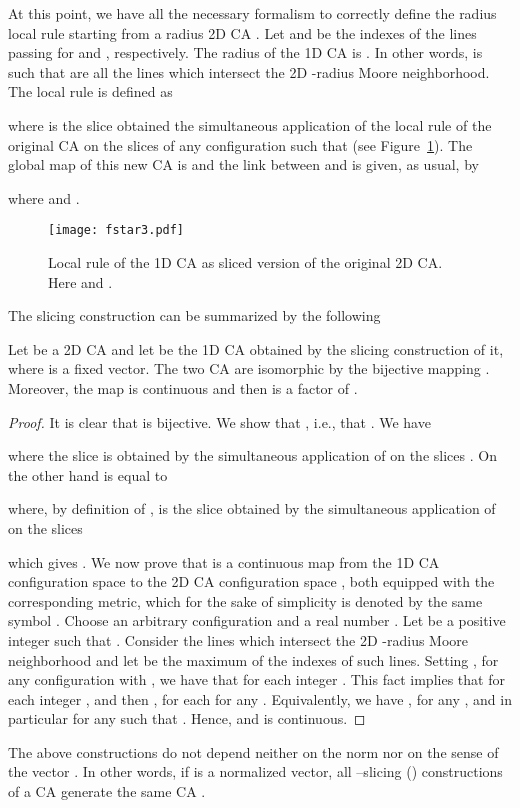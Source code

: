 \documentclass{llncs}
\begin{document}
At this point, we have all the necessary formalism to correctly
define the radius  local rule 
starting from a radius  2D CA . Let  and  be the
indexes of the lines passing for  and ,
respectively. The radius of the 1D CA is .
In other words,  is such that  are
all the lines which intersect the 2D -radius Moore
neighborhood. The local rule is defined as

where  is the slice obtained the simultaneous
application of the local rule  of the original CA on the slices
 of any configuration  such that
 (see
Figure~\ref{fig:slicing-f}). The global map of this new CA is
 and the link between  and 
is given, as usual, by

where  and
.
\begin{figure}[!htb]
  \begin{center}
     \texttt{[image: fstar3.pdf]}
   \end{center}
   \caption{Local rule  of the 1D CA as sliced version of the original 2D CA.
   Here  and .}
   \label{fig:slicing-f}
\end{figure}
\smallskip

The slicing construction can be summarized by the following
\begin{theorem}\label{lem:slicingiso}
 Let  be a 2D CA and let  be the 1D CA
 obtained by the  slicing construction of it, where 
 is a fixed vector. The two CA are isomorphic by the bijective
  mapping . Moreover,
  the map  is continuous and then 
  is a factor of .

\end{theorem}
\begin{proof}
It is clear that  is bijective.
We show that , i.e., that . We have

where the slice  is obtained by the simultaneous
application of  on the slices . On
the other hand  is equal to

where, by definition of ,  is the slice obtained by the
simultaneous application of  on the slices

which gives . We now prove that  is a
continuous map from the 1D CA configuration space  to
the 2D CA configuration space , both equipped with the
corresponding metric, which for the sake of simplicity is denoted
by the same symbol . Choose an arbitrary configuration
 and a real
number . Let  be a positive integer such that
. Consider the lines  which
intersect the 2D -radius Moore neighborhood and let  be the
maximum of the indexes of such lines.
Setting , for any configuration
 with , we have that  for
each integer . This fact implies that
 for each integer ,
and then , for each
for any . Equivalently, we have
, for any
, and in particular for any
 such that . Hence,
 and  is
continuous.
\end{proof}
\begin{remark}
The above constructions do not depend neither on the norm nor on
the sense of the vector . In other words, if  is a
normalized vector, all --slicing () constructions of
a CA  generate the same CA .
\end{remark}
\end{document}
